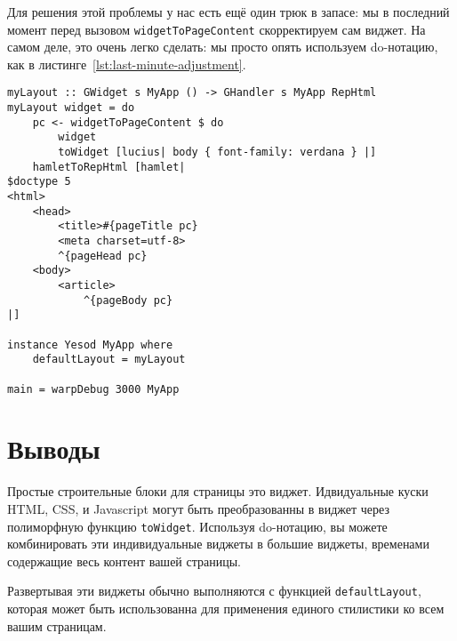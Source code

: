 Для решения этой проблемы у нас есть ещё один трюк в запасе: мы в последний момент перед вызовом \lstinline'widgetToPageContent' скорректируем сам виджет. На самом деле, это очень легко сделать: мы просто опять используем do-нотацию, как в листинге~\ref{lst:last-minute-adjustment}.

\begin{lstlisting}[caption={Корректировка виджета <<в последний момент>>},label={lst:last-minute-adjustment}]
myLayout :: GWidget s MyApp () -> GHandler s MyApp RepHtml
myLayout widget = do
    pc <- widgetToPageContent $ do
        widget
        toWidget [lucius| body { font-family: verdana } |]
    hamletToRepHtml [hamlet|
$doctype 5
<html>
    <head>
        <title>#{pageTitle pc}
        <meta charset=utf-8>
        ^{pageHead pc}
    <body>
        <article>
            ^{pageBody pc}
|]

instance Yesod MyApp where
    defaultLayout = myLayout

main = warpDebug 3000 MyApp
\end{lstlisting}

\section{Выводы}

Простые строительные блоки для страницы это виджет. Идвидуальные куски HTML, CSS, и Javascript могут быть преобразованны в виджет через полиморфную функцию \lstinline'toWidget'. Используя do-нотацию, вы можете комбинировать эти индивидуальные виджеты в большие виджеты, временами содержащие весь контент вашей страницы.

Развертывая эти виджеты обычно выполняются с функцией \lstinline'defaultLayout', которая может быть использованна для применения единого стилистики ко всем вашим страницам.
